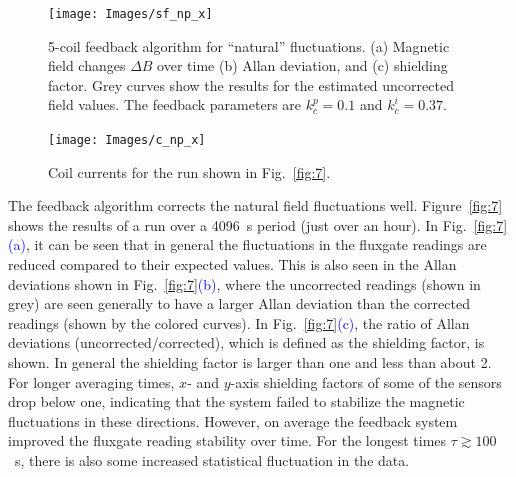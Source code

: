 \begin{figure}
\centering
\texttt{[image: Images/sf\_np\_x]}
\caption[5-coil feedback algorithm for ``natural'' fluctuations]{5-coil feedback algorithm for ``natural'' fluctuations.  (a) Magnetic field changes $\Delta B$ over time (b) Allan deviation, and (c) shielding factor.  Grey curves show the results for the estimated uncorrected field values.  The feedback parameters are $k_c^p=0.1$ and $k_c^i=0.37$.}
\label{fig:7}
\texttt{[image: Images/c\_np\_x]}
\caption{Coil currents for the run shown in Fig.~\ref{fig:7}.}
\label{fig:8}
\end{figure}

The feedback algorithm corrects the natural field fluctuations well.
Figure~\ref{fig:7} shows the results of a run over a 4096~s period
(just over an hour).  In Fig.~\ref{fig:7}\textcolor{blue}{(a)}, it can be seen that in
general the fluctuations in the fluxgate readings are reduced compared
to their expected values.  This is also seen in the Allan deviations
shown in Fig.~\ref{fig:7}\textcolor{blue}{(b)}, where the uncorrected readings (shown in
grey) are seen generally to have a larger Allan deviation than the
corrected readings (shown by the colored curves).  In
Fig.~\ref{fig:7}\textcolor{blue}{(c)}, the ratio of Allan deviations
(uncorrected/corrected), which is defined as the shielding factor, is
shown.  In general the shielding factor is larger than one and less
than about 2.  For longer averaging times, $x$- and $y$-axis shielding factors of some of the sensors drop below one, indicating that the system failed to stabilize the magnetic fluctuations in these directions. However, on average the feedback
system improved the fluxgate reading stability over time.  For the
longest times $\tau\gtrsim 100$~s, there is also some increased
statistical fluctuation in the data.

